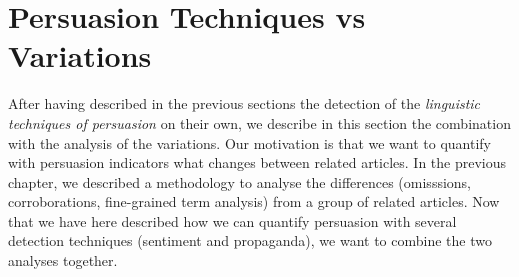 



\section{\statusgreen Persuasion Techniques vs Variations}
\label{sec:lp_relationship}

After having described in the previous sections the detection of the \emph{linguistic techniques of persuasion} on their own, we describe in this section the combination with the analysis of the variations.
Our motivation is that we want to quantify with persuasion indicators what changes between related articles.
In the previous chapter, we described a methodology to analyse the differences (omisssions, corroborations, fine-grained term analysis) from a group of related articles.
Now that we have here described how we can quantify persuasion with several detection techniques (sentiment and propaganda), we want to combine the two analyses together.

